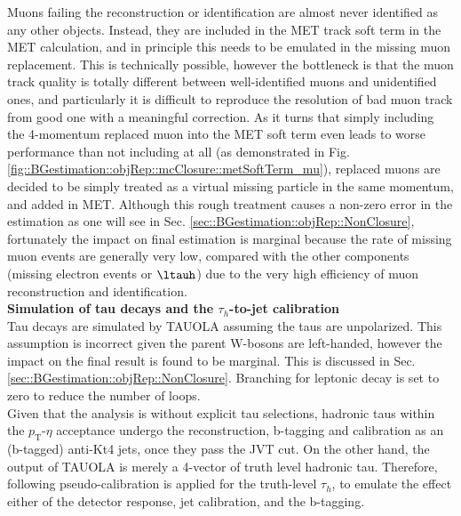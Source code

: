 Muons failing the reconstruction or identification are almost never identified as any other objects. Instead, they are included in the MET track soft term in the MET calculation, and in principle this needs to be emulated in the missing muon replacement. This is technically possible, however the bottleneck is that the muon track quality is totally different between well-identified muons and unidentified ones, and particularly it is difficult to reproduce the resolution of bad muon track from good one with a meaningful correction. As it turns that simply including the 4-momentum replaced muon into the MET soft term even leads to worse performance than not including at all (as demonstrated in Fig. \ref{fig::BGestimation::objRep::mcClosure::metSoftTerm_mu}), replaced muons are decided to be simply treated as a virtual missing particle in the same momentum, and added in MET.
Although this rough treatment causes a non-zero error in the estimation as one will see in Sec. \ref{sec::BGestimation::objRep::NonClosure}, fortunately the impact on final estimation is marginal because the rate of missing muon events are generally very low, compared with the other components (missing electron events or $\ltauh$) due to the very high efficiency of muon reconstruction and identification. \\


\noindent \textbf{Simulation of tau decays and the $\tau_h$-to-jet calibration } \\
Tau decays are simulated by TAUOLA \cite{TAUOLA1} \cite{TAUOLA2} \cite{TAUOLA3} assuming the taus are unpolarized. This assumption is incorrect given the parent W-bosons are left-handed, however the impact on the final result is found to be marginal. This is discussed in Sec. \ref{sec::BGestimation::objRep::NonClosure}. Branching for leptonic decay is set to zero to reduce the number of loops. \\

Given that the analysis is without explicit tau selections, hadronic taus within the $p_{\mathrm{T}}$-$\eta$ acceptance undergo the reconstruction, b-tagging and calibration as an (b-tagged) anti-Kt4 jets, once they pass the JVT cut. On the other hand, the output of TAUOLA is merely a 4-vector of truth level hadronic tau. Therefore, following pseudo-calibration is applied for the truth-level $\tau_h$, to emulate the effect either of the detector response, jet calibration, and the b-tagging.\\

